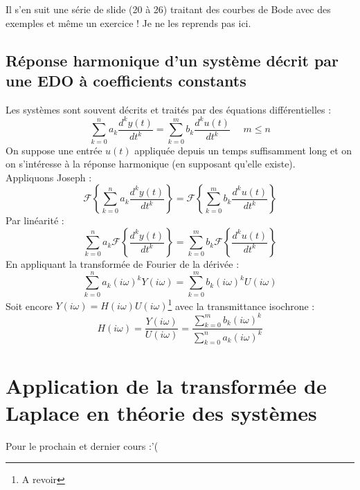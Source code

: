 	Il s'en suit une série de slide (20 à 26) traitant des courbes de Bode avec des exemples 
	et même un exercice ! Je ne les reprends pas ici.






	\subsection{Réponse harmonique d'un système décrit par une EDO à coefficients constants}
	Les systèmes sont souvent décrits et traités par des équations différentielles :
	\begin{equation}
	\sum_{k=0}^n a_k\dfrac{d^ky(t)}{dt^k} = \sum_{k=0}^m b_k\dfrac{d^ku(t)}{dt^k}\ \ \ \ \ \
	m\leq n
	\end{equation}
	On suppose une entrée $u(t)$ appliquée depuis un temps suffisamment long et on on s'intéresse
	à la réponse harmonique (en supposant qu'elle existe).\\
	Appliquons Joseph :
	\begin{equation}
	\mathcal{F}\left\{\sum_{k=0}^n a_k\dfrac{d^ky(t)}{dt^k}\right\} =	\mathcal{F}\left\{
	\sum_{k=0}^m b_k\dfrac{d^ku(t)}{dt^k}\right\}
	\end{equation}
	Par linéarité :
	\begin{equation}
	\sum_{k=0}^n a_k\mathcal{F}\left\{\dfrac{d^ky(t)}{dt^k}\right\} =	\sum_{k=0}^m b_k
	\mathcal{F}\left\{\dfrac{d^ku(t)}{dt^k}\right\}
	\end{equation}
	En appliquant la transformée de Fourier de la dérivée :
	\begin{equation}
	\sum_{k=0}^n a_k(i\omega)^kY(i\omega) = \sum_{k=0}^m b_k(i\omega)^kU(i\omega)
	\end{equation}
	Soit encore $Y(i\omega) = H(i\omega)U(i\omega)$\footnote{A revoir} avec la transmittance 
	isochrone :
	\begin{equation}
	H(i\omega) = \dfrac{Y(i\omega)}{U(i\omega)} = \dfrac{\sum_{k=0}^m b_k(i\omega)^k
	}{\sum_{k=0}^n a_k(i\omega)^k}
	\end{equation}




\section{Application de la transformée de Laplace en théorie des systèmes}
Pour le prochain et dernier cours :'(